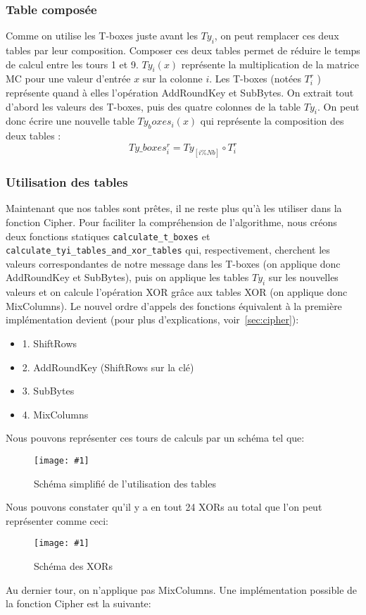 \documentclass[a4paper, 10pt]{article}
\newcommand{\imagewidth}{0.9\textwidth}
\newcommand{\displayimage}[2]{
  \begin{figure}[H]
    \centering
    \texttt{[image: \#1]}
    \caption{#2}
  \end{figure}
}
\begin{document}
  \subsubsection{Table composée}
  \normalsize
  Comme on utilise les T-boxes juste avant les \(Ty_{i}\), on peut remplacer ces deux tables par leur 
  composition. Composer ces deux tables permet de réduire le temps de calcul entre les tours 1 et 9.
  \(Ty_{i}(x)\) représente la multiplication de la matrice MC pour une valeur d'entrée \(x\) sur la colonne \(i\). Les 
  T-boxes (notées \(T_{i}^{r}\) ) représente quand à elles l'opération AddRoundKey et SubBytes.
  On extrait tout d'abord les valeurs des T-boxes, puis des quatre colonnes de la table \(Ty_{i}\).
  On peut donc écrire une nouvelle table \(Ty_boxes_{i}(x)\) qui représente la composition des deux tables :
\[ Ty\_boxes_{i}^{r} = Ty_{[i \% Nb]} \circ T_{i}^{r} \]
  \subsubsection{Utilisation des tables}
  \normalsize
  Maintenant que nos tables sont prêtes, il ne reste plus qu'à les utiliser dans la fonction Cipher.
  Pour faciliter la compréhension de l'algorithme, nous créons deux fonctions statiques \texttt{calculate_t_boxes}
  et \texttt{calculate_tyi_tables_and_xor_tables} qui, respectivement, cherchent les valeurs correspondantes 
  de notre 
  message dans les T-boxes (on applique donc AddRoundKey et SubBytes), puis on applique les tables 
  \(Ty_{i}\) sur les 
  nouvelles valeurs et on calcule l'opération XOR grâce aux tables XOR (on applique donc MixColumns). Le nouvel ordre d'appels des
  fonctions équivalent à la première implémentation devient (pour plus d'explications, voir~\ref{sec:cipher}):\\
  \begin{itemize}
    \item 1. ShiftRows
    \item 2. AddRoundKey (ShiftRows sur la clé)
    \item 3. SubBytes
    \item 4. MixColumns
  \end{itemize}
  Nous pouvons représenter ces tours de calculs par un schéma tel que:\\
  \displayimage{images/schéma_opération_tables.png}{Schéma simplifié de l'utilisation des tables~\cite{key1}}
  Nous pouvons constater qu'il y a en tout 24 XORs au total que l'on peut représenter comme ceci:\\
  \displayimage{images/schéma_précis_table_composée.png}{Schéma des XORs~\cite{key1}}
  Au dernier tour, on n'applique pas MixColumns. Une implémentation possible de la fonction Cipher est la suivante:
  
\end{document}

